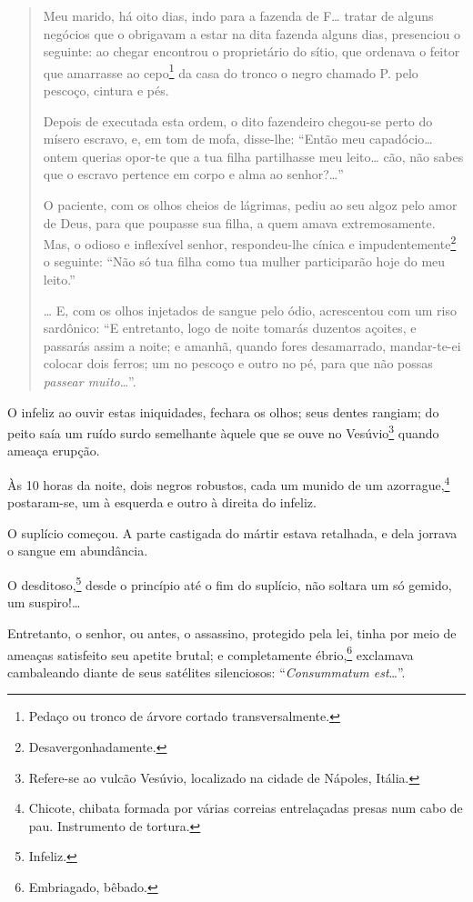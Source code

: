 \begin{quote}
Meu marido, há oito dias, indo para a fazenda de F\ldots{} tratar de alguns
negócios que o obrigavam a estar na dita fazenda alguns dias, presenciou
o seguinte: ao chegar encontrou o proprietário do sítio, que ordenava o
feitor que amarrasse ao cepo\footnote{Pedaço ou tronco de árvore
  cortado transversalmente.} da casa do tronco o negro chamado P. pelo
pescoço, cintura e pés.

Depois de executada esta ordem, o dito fazendeiro chegou-se perto do
mísero escravo, e, em tom de mofa, disse-lhe: ``Então meu capadócio\ldots{}
ontem querias opor-te que a tua filha partilhasse meu leito\ldots{} cão, não
sabes que o escravo pertence em corpo e alma ao senhor?\ldots{}''

O paciente, com os olhos cheios de lágrimas, pediu ao seu algoz pelo
amor de Deus, para que poupasse sua filha, a quem amava extremosamente.
Mas, o odioso e inflexível senhor, respondeu-lhe cínica e
impudentemente\footnote{Desavergonhadamente.} o seguinte: ``Não só tua
filha como tua mulher participarão hoje do meu leito.''

\ldots{} E, com os olhos injetados de sangue pelo ódio, acrescentou com um
riso sardônico: ``E entretanto, logo de noite tomarás duzentos açoites, e
passarás assim a noite; e amanhã, quando fores desamarrado, mandar-te-ei
colocar dois ferros; um no pescoço e outro no pé, para que não possas
\emph{passear muito}\ldots{}''.
\end{quote}

O infeliz ao ouvir estas iniquidades, fechara os olhos; seus dentes
rangiam; do peito saía um ruído surdo semelhante àquele que se ouve no
Vesúvio\footnote{Refere-se ao vulcão Vesúvio, localizado na cidade de
  Nápoles, Itália.} quando ameaça erupção.

Às 10 horas da noite, dois negros robustos, cada um munido de um
azorrague,\footnote{Chicote, chibata formada por várias correias
  entrelaçadas presas num cabo de pau. Instrumento de tortura.}
postaram-se, um à esquerda e outro à direita do infeliz.

O suplício começou. A parte castigada do mártir estava retalhada, e dela
jorrava o sangue em abundância.

O desditoso,\footnote{Infeliz.} desde o princípio até o fim do
suplício, não soltara um só gemido, um suspiro!\ldots{}

Entretanto, o senhor, ou antes, o assassino, protegido pela lei, tinha
por meio de ameaças satisfeito seu apetite brutal; e completamente
ébrio,\footnote{Embriagado, bêbado.} exclamava cambaleando diante de
seus satélites silenciosos:
``\emph{Consummatum est}\ldots{}''.

